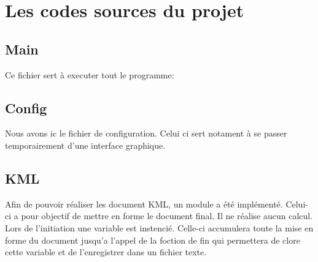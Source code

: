 
\section{Les codes sources du projet}
    \subsection{Main}
Ce fichier sert à executer tout le programme:

    \subsection{Config}
Nous avons ic le fichier de configuration. Celui ci sert notament à se passer temporairement d'une interface graphique.

    \subsection{KML}
Afin de pouvoir réaliser les document KML, un module a été implémenté. Celui-ci a pour objectif de mettre en forme le document final. Il ne réalise aucun calcul. Lors de l'initiation une variable est instencié. Celle-ci accumulera toute la mise en forme du document jusqu'a l'appel de la foction de fin qui permettera de clore cette variable et de l'enregistrer dans un fichier texte.

